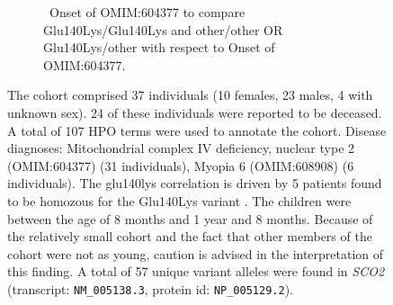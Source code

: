 \begin{figure}[htbp]
\vspace{2em}

\begin{subfigure}[b]{0.95\textwidth}
\captionsetup{justification=raggedright,singlelinecheck=false}
\caption{ Onset of OMIM:604377 to compare Glu140Lys/Glu140Lys and other/other OR Glu140Lys/other with respect to Onset of OMIM:604377. }
\end{subfigure}

\vspace{2em}

\caption{ The cohort comprised 37 individuals (10 females, 23 males, 4 with unknown sex). 24 of these individuals were reported to be deceased. 
A total of 107 HPO terms were used to annotate the cohort. Disease diagnoses: Mitochondrial complex IV deficiency, nuclear type 2 (OMIM:604377) (31 individuals), 
Myopia 6 (OMIM:608908) (6 individuals). The glu140lys correlation is driven by 5 patients found to be homozous for the Glu140Lys variant \cite{PMID_15499950}. 
The children were between the age of 8 months and 1 year and 8 months. Because of the relatively small cohort and the fact that other members of the cohort were not as young, caution is advised in the interpretation of this finding.  A total of 57 unique variant alleles were found in \textit{SCO2} (transcript: \texttt{NM\_005138.3}, protein id: \texttt{NP\_005129.2}).}
\end{figure}
